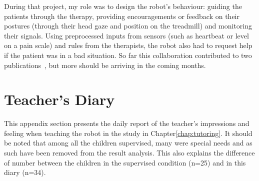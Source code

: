 During that project, my role was to design the robot's behaviour: guiding the patients through the therapy, providing encouragements or feedback on their postures (through their head gaze and position on the treadmill) and monitoring their signals. Using preprocessed inputs from sensors (such as heartbeat or level on a pain scale) and rules from the therapists, the robot also had to request help if the patient was in a bad situation. So far this collaboration contributed to two publications~\citep{lara2017human,casas2018social}, but more should be arriving in the coming months.

\cleartooddpage
\chapter{Teacher's Diary} \label{app:diary}
This appendix section presents the daily report of the teacher's impressions and feeling when teaching the robot in the study in Chapter\ref{chap:tutoring}. It should be noted that among all the children supervised, many were special needs and as such have been removed from the result analysis. This also explains the difference of number between the children in the supervised condition (n=25) and in this diary (n=34).

%

